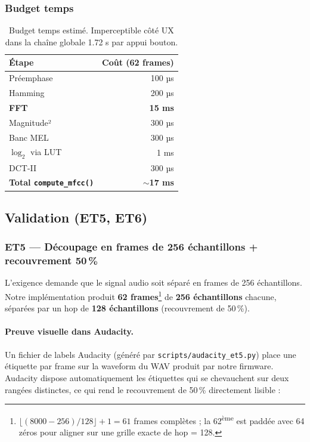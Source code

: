 \subsubsection{Budget temps}

\begin{table}[H]
\centering
\small
\begin{tabularx}{0.6\linewidth}{@{}l r@{}}
\toprule
\textbf{Étape} & \textbf{Coût (62 frames)} \\
\midrule
Préemphase & 100 µs \\
Hamming & 200 µs \\
\textbf{FFT} & \textbf{15 ms} \\
Magnitude² & 300 µs \\
Banc MEL & 300 µs \\
$\log_2$ via LUT & 1 ms \\
DCT-II & 300 µs \\
\midrule
\textbf{Total \texttt{compute\_mfcc()}} & \textbf{$\sim$17 ms} \\
\bottomrule
\end{tabularx}
\caption{Budget temps estimé. Imperceptible côté UX dans la chaîne globale 1.72 s par appui bouton.}
\end{table}

\subsection{Validation (ET5, ET6)}

\subsubsection{ET5 --- Découpage en frames de 256 échantillons + recouvrement 50\,\%}
\label{sec:fp4-et5}

L'exigence  demande que le signal audio soit séparé en frames de 256 échantillons. Notre implémentation produit \textbf{62 frames}\footnote{$\lfloor (8000 - 256) / 128 \rfloor + 1 = 61$ frames complètes ; la 62\textsuperscript{ème} est paddée avec 64 zéros pour aligner sur une grille exacte de hop = 128.} de \textbf{256 échantillons} chacune, séparées par un hop de \textbf{128 échantillons} (recouvrement de 50\,\%).

\paragraph{Preuve visuelle dans Audacity.}
Un fichier de labels Audacity (généré par \verb|scripts/audacity_et5.py|) place une étiquette par frame sur la waveform du WAV produit par notre firmware. Audacity dispose automatiquement les étiquettes qui se chevauchent sur deux rangées distinctes, ce qui rend le recouvrement de 50\,\% directement lisible :

